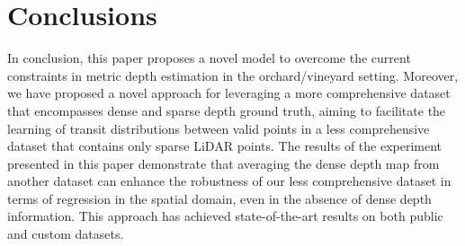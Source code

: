 \documentclass{article}
\begin{document}
\section{Conclusions}
    In conclusion, this paper proposes a novel model to overcome the current constraints in metric depth estimation in the orchard/vineyard setting. Moreover, we have proposed a novel approach for leveraging a more comprehensive dataset that encompasses dense and sparse depth ground truth, aiming to facilitate the learning of transit distributions between valid points in a less comprehensive dataset that contains only sparse LiDAR points. The results of the experiment presented in this paper demonstrate that averaging the dense depth map from another dataset can enhance the robustness of our less comprehensive dataset in terms of regression in the spatial domain, even in the absence of dense depth information. This approach has achieved state-of-the-art results on both public and custom datasets.



\end{document}
